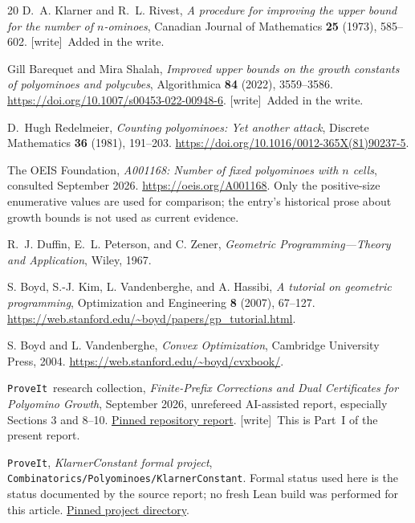 \documentclass[11pt,a4paper]{article}
\theoremstyle{definition}
\theoremstyle{remark}
\newcommand{\repo}{\texttt{ProveIt}}
\newcommand{\wtag}{\textsf{\small[write]}}
\begin{document}
\begin{thebibliography}{20}
D.~A. Klarner and R.~L. Rivest, \emph{A procedure for improving the upper
bound for the number of $n$-ominoes}, Canadian Journal of Mathematics
\textbf{25} (1973), 585--602.
\wtag\ Added in the write.

Gill Barequet and Mira Shalah, \emph{Improved upper bounds on the growth
constants of polyominoes and polycubes}, Algorithmica \textbf{84} (2022),
3559--3586. \url{https://doi.org/10.1007/s00453-022-00948-6}.
\wtag\ Added in the write.

D.~Hugh Redelmeier, \emph{Counting polyominoes: Yet another attack},
Discrete Mathematics \textbf{36} (1981), 191--203.
\url{https://doi.org/10.1016/0012-365X(81)90237-5}.

The OEIS Foundation, \emph{A001168: Number of fixed polyominoes with $n$
cells}, consulted September 2026.
\url{https://oeis.org/A001168}.
Only the positive-size enumerative values are used for comparison; the
entry's historical prose about growth bounds is not used as current evidence.

R.~J. Duffin, E.~L. Peterson, and C. Zener,
\emph{Geometric Programming---Theory and Application}, Wiley, 1967.

S. Boyd, S.-J. Kim, L. Vandenberghe, and A. Hassibi,
\emph{A tutorial on geometric programming}, Optimization and Engineering
\textbf{8} (2007), 67--127.
\url{https://web.stanford.edu/~boyd/papers/gp_tutorial.html}.

S. Boyd and L. Vandenberghe, \emph{Convex Optimization},
Cambridge University Press, 2004.
\url{https://web.stanford.edu/~boyd/cvxbook/}.

\repo\ research collection,
\emph{Finite-Prefix Corrections and Dual Certificates for Polyomino Growth},
September 2026, unrefereed AI-assisted report, especially Sections 3 and 8--10.
\href{https://github.com/VladimirReshetnikov/ProveIt/tree/74f7f5bdba1aa728b340509701a0fa4e45e8dbf3/SetTheory/Cardinals/docs/reports/enumerative-combinatorics/polyomino-growth-finite-prefix-corrections}{Pinned repository report}.
\wtag\ This is Part~I of the present report.

\repo, \emph{KlarnerConstant formal project},
\texttt{Combinatorics/Polyominoes/}\allowbreak\texttt{KlarnerConstant}.
Formal status used here is the status documented by the source report;
no fresh Lean build was performed for this article.
\href{https://github.com/VladimirReshetnikov/ProveIt/tree/74f7f5bdba1aa728b340509701a0fa4e45e8dbf3/Combinatorics/Polyominoes/KlarnerConstant}{Pinned project directory}.


\end{thebibliography}
\end{document}
